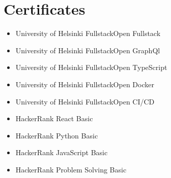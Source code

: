 \section{Certificates}

\begin{itemize}
	\item University of Helsinki FullstackOpen Fullstack
	\item University of Helsinki FullstackOpen GraphQl
	\item University of Helsinki FullstackOpen TypeScript
	\item University of Helsinki FullstackOpen Docker
	\item University of Helsinki FullstackOpen CI/CD
	\item HackerRank React Basic
	\item HackerRank Python Basic
	\item HackerRank JavaScript Basic
	\item HackerRank Problem Solving Basic
\end{itemize}